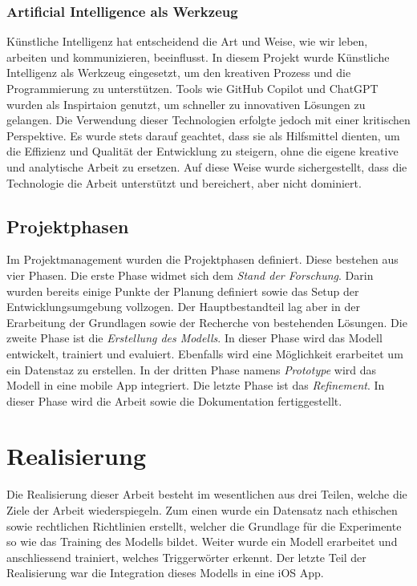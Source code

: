 \documentclass[11pt,a4paper]{article}
\begin{document}
\subsubsection{Artificial Intelligence als Werkzeug}
Künstliche Intelligenz hat entscheidend die Art und Weise, wie wir leben, arbeiten und 
kommunizieren, beeinflusst. In diesem Projekt wurde Künstliche Intelligenz als Werkzeug eingesetzt, 
um den kreativen Prozess und die Programmierung zu unterstützen. Tools wie GitHub Copilot und 
ChatGPT wurden als Inspirtaion genutzt, um schneller zu innovativen Lösungen zu 
gelangen. Die Verwendung dieser Technologien erfolgte jedoch mit einer kritischen Perspektive. Es 
wurde stets darauf geachtet, dass sie als Hilfsmittel dienten, um die Effizienz und Qualität der 
Entwicklung zu steigern, ohne die eigene kreative und analytische Arbeit zu ersetzen. Auf diese 
Weise wurde sichergestellt, dass die Technologie die Arbeit unterstützt und bereichert, aber nicht 
dominiert.


\subsection{Projektphasen}
Im Projektmanagement wurden die Projektphasen definiert. Diese bestehen aus vier Phasen. Die erste
Phase widmet sich dem \textit{Stand der Forschung}. Darin wurden bereits einige Punkte der 
Planung definiert sowie das Setup der Entwicklungsumgebung vollzogen. Der Hauptbestandteil lag aber in der 
Erarbeitung der Grundlagen sowie der Recherche von bestehenden Lösungen. Die zweite Phase ist die 
\textit{Erstellung des Modells}. In dieser Phase wird das Modell entwickelt, trainiert und 
evaluiert. Ebenfalls wird eine Möglichkeit erarbeitet um ein Datenstaz zu erstellen. In der 
dritten Phase namens \textit{Prototype} wird das Modell in eine mobile App integriert. 
Die letzte Phase ist das \textit{Refinement}. In dieser Phase wird die Arbeit sowie die
Dokumentation fertiggestellt. 


\newpage \section{Realisierung}
Die Realisierung dieser Arbeit besteht im wesentlichen aus drei Teilen, welche die Ziele der Arbeit 
wiederspiegeln. Zum einen wurde ein Datensatz nach ethischen sowie rechtlichen Richtlinien erstellt, 
welcher die Grundlage für die Experimente so wie das Training des Modells bildet. Weiter wurde ein 
Modell erarbeitet und anschliessend trainiert, welches Triggerwörter erkennt. Der letzte Teil der 
Realisierung war die Integration dieses Modells in eine iOS App.
\end{document}
